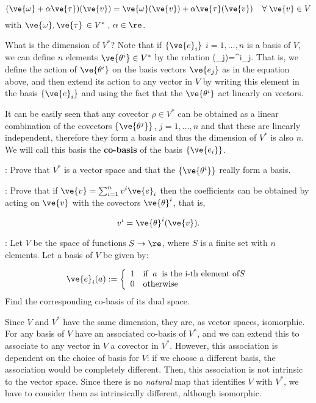 \[
(\ve{\omega}+\alpha \ve{\tau})(\ve{ v})=
\ve{\omega}(\ve{ v})+\alpha \ve{\tau}(\ve{ v})\;\;\;\;\forall\;\ve{v}\in V
\]
%
with  $\ve{\omega},\ve{\tau}\,\in V^*\;,\,\alpha \in \re$. 

What is the dimension of $V^*$? 
Note that if
$\{\ve{ e}_i\}$ $i=1,\ldots,n$ is a basis of $V$, we can define $n$
elements $\ve{ \theta^i}  \in V^*$ by the relation 
\beq
{}(_j)=\delta^i_{\;j}.
\eeq
That is, we define the action of $\ve{ \theta^i}$ on the basis vectors $\ve{e_j}$
as in the equation above, and then extend its action to any vector in $V$ by writing this element in the basis $\{\ve{ e}_i\}$
and using the fact that the $\ve{ \theta^i}$ act linearly on vectors.
  
It can be easily seen that any covector $\rho \in V^*$ can be obtained
as a linear combination of the covectors $\{\ve{\theta^j}\}$,
$j=1,\ldots,n$ and that these are linearly independent, therefore
they form a basis and thus the dimension of $V^*$ is also $n$. We will call this basis the {\bf co-basis} of the basis $\{\ve{e_i}\}$.
\espa

\ejer: Prove that $V^*$ is a vector space and that the $\{\ve{ \theta^i}\}$
really form a basis.

\ejer: Prove that if $\ve{v} = \sum_{i=1}^{n} v^i \ve{e}_i$ then the coefficients can be obtained by acting on $\ve{v}$ with the covectors $\ve{\theta}^i$, that is,

\[
v^i = \ve{\theta}^i(\ve{v}).
\]

\ejer:
Let $V$ be the space of functions $S \to \re$, where $S$ is a finite set with $n$ elements.
Let a basis of $V$ be given by:

\[
\ve{e}_i (a) := \left\{
\begin{array}{cl}
1 & \text{if} \;\; a \;\; \text{is the i-th element of} S \\
0 & \text{otherwise}
\end{array}
\right.
\]
%
Find the corresponding co-basis of its dual space. 

Since $V$ and $V^*$ have the same dimension, they are, as vector
spaces, isomorphic. For any basis of $V$ have an associated co-basis of $V^*$, and we can extend this to associate to any vector in $V$ a covector in $V^*$.
However, this association is dependent on the choice of basis for $V$: if we choose a different basis, the association would be completely different. 
Then, this association is not intrinsic to the vector space. Since there is no \textit{natural} map that identifies $V$ with $V^*$, we have to consider them as intrinsically different, although isomorphic. 


